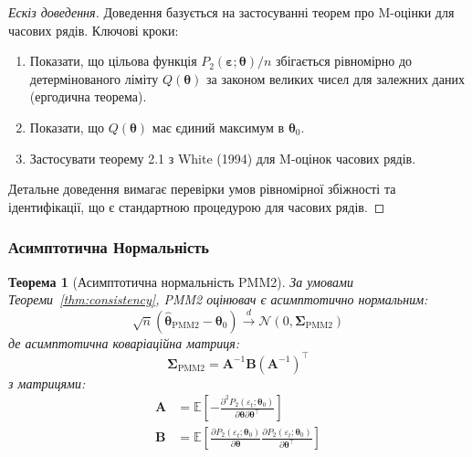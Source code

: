 \documentclass[12pt,a4paper]{article}
\newtheorem{theorem}{Теорема}[section]
\begin{document}
	\begin{proof}[Ескіз доведення]
		Доведення базується на застосуванні теорем про M-оцінки для часових рядів. Ключові кроки:
		\begin{enumerate}
			\item Показати, що цільова функція $P_2(\boldsymbol{\varepsilon}; \boldsymbol{\theta})/n$ збігається рівномірно до детермінованого ліміту $Q(\boldsymbol{\theta})$ за законом великих чисел для залежних даних (ергодична теорема).
			
			\item Показати, що $Q(\boldsymbol{\theta})$ має єдиний максимум в $\boldsymbol{\theta}_0$.
			
			\item Застосувати теорему 2.1 з White (1994) для M-оцінок часових рядів.
		\end{enumerate}
		Детальне доведення вимагає перевірки умов рівномірної збіжності та ідентифікації, що є стандартною процедурою для часових рядів.
	\end{proof}
	
	\subsubsection{Асимптотична Нормальність}
	
	\begin{theorem}[Асимптотична нормальність PMM2]
		\label{thm:asymptotic_normality}
		За умовами Теореми~\ref{thm:consistency}, PMM2 оцінювач є асимптотично нормальним:
		\begin{equation}
			\label{eq:asymptotic_normality}
			\sqrt{n}(\hat{\boldsymbol{\theta}}_{\text{PMM2}} - \boldsymbol{\theta}_0) \xrightarrow{d} \mathcal{N}(0, \boldsymbol{\Sigma}_{\text{PMM2}})
		\end{equation}
		де асимптотична коваріаційна матриця:
		\begin{equation}
			\label{eq:asymptotic_covariance}
			\boldsymbol{\Sigma}_{\text{PMM2}} = \mathbf{A}^{-1} \mathbf{B} (\mathbf{A}^{-1})^\top
		\end{equation}
		з матрицями:
		\begin{align}
			\mathbf{A} &= \mathbb{E}\left[ -\frac{\partial^2 P_2(\varepsilon_t; \boldsymbol{\theta}_0)}{\partial \boldsymbol{\theta} \partial \boldsymbol{\theta}^\top} \right] \label{eq:matrix_A} \\
			\mathbf{B} &= \mathbb{E}\left[ \frac{\partial P_2(\varepsilon_t; \boldsymbol{\theta}_0)}{\partial \boldsymbol{\theta}} \frac{\partial P_2(\varepsilon_t; \boldsymbol{\theta}_0)}{\partial \boldsymbol{\theta}^\top} \right] \label{eq:matrix_B}
		\end{align}
	\end{theorem}
	
\end{document}
